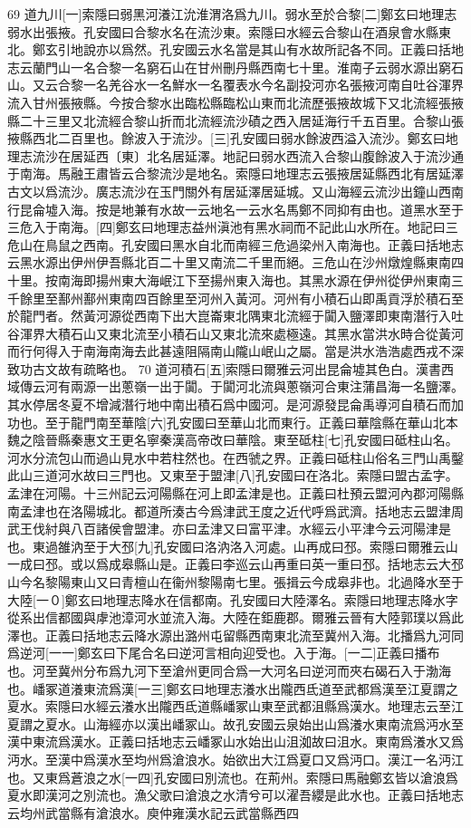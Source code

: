 69
道九川[一]索隱曰弱黑河瀁江沇淮渭洛爲九川。弱水至於合黎[二]鄭玄曰地理志弱水出張掖。孔安國曰合黎水名在流沙東。索隱曰水經云合黎山在酒泉會水縣東北。鄭玄引地說亦以爲然。孔安國云水名當是其山有水故所記各不同。正義曰括地志云蘭門山一名合黎一名窮石山在甘州刪丹縣西南七十里。淮南子云弱水源出窮石山。又云合黎一名羌谷水一名鮮水一名覆表水今名副投河亦名張掖河南自吐谷渾界流入甘州張掖縣。今按合黎水出臨松縣臨松山東而北流歷張掖故城下又北流經張掖縣二十三里又北流經合黎山折而北流經流沙磧之西入居延海行千五百里。合黎山張掖縣西北二百里也。餘波入于流沙。[三]孔安國曰弱水餘波西溢入流沙。鄭玄曰地理志流沙在居延西〔東〕北名居延澤。地記曰弱水西流入合黎山腹餘波入于流沙通于南海。馬融王肅皆云合黎流沙是地名。索隱曰地理志云張掖居延縣西北有居延澤古文以爲流沙。廣志流沙在玉門關外有居延澤居延城。又山海經云流沙出鐘山西南行昆侖墟入海。按是地兼有水故一云地名一云水名馬鄭不同抑有由也。道黑水至于三危入于南海。[四]鄭玄曰地理志益州滇池有黑水祠而不記此山水所在。地記曰三危山在鳥鼠之西南。孔安國曰黑水自北而南經三危過梁州入南海也。正義曰括地志云黑水源出伊州伊吾縣北百二十里又南流二千里而絕。三危山在沙州燉煌縣東南四十里。按南海即揚州東大海岷江下至揚州東入海也。其黑水源在伊州從伊州東南三千餘里至鄯州鄯州東南四百餘里至河州入黃河。河州有小積石山即禹貢浮於積石至於龍門者。然黃河源從西南下出大崑崙東北隅東北流經于闐入鹽澤即東南潛行入吐谷渾界大積石山又東北流至小積石山又東北流來處極遠。其黑水當洪水時合從黃河而行何得入于南海南海去此甚遠阻隔南山隴山岷山之屬。當是洪水浩浩處西戎不深致功古文故有疏略也。
70
道河積石[五]索隱曰爾雅云河出昆侖墟其色白。漢書西域傳云河有兩源一出蔥嶺一出于闐。于闐河北流與蔥嶺河合東注蒲昌海一名鹽澤。其水停居冬夏不增減潛行地中南出積石爲中國河。是河源發昆侖禹導河自積石而加功也。至于龍門南至華陰[六]孔安國曰至華山北而東行。正義曰華陰縣在華山北本魏之陰晉縣秦惠文王更名寧秦漢高帝改曰華陰。東至砥柱[七]孔安國曰砥柱山名。河水分流包山而過山見水中若柱然也。在西虢之界。正義曰砥柱山俗名三門山禹鑿此山三道河水故曰三門也。又東至于盟津[八]孔安國曰在洛北。索隱曰盟古孟字。孟津在河陽。十三州記云河陽縣在河上即孟津是也。正義曰杜預云盟河內郡河陽縣南孟津也在洛陽城北。都道所湊古今爲津武王度之近代呼爲武濟。括地志云盟津周武王伐紂與八百諸侯會盟津。亦曰孟津又曰富平津。水經云小平津今云河陽津是也。東過雒汭至于大邳[九]孔安國曰洛汭洛入河處。山再成曰邳。索隱曰爾雅云山一成曰邳。或以爲成皋縣山是。正義曰李巡云山再重曰英一重曰邳。括地志云大邳山今名黎陽東山又曰青檀山在衞州黎陽南七里。張揖云今成皋非也。北過降水至于大陸[一０]鄭玄曰地理志降水在信都南。孔安國曰大陸澤名。索隱曰地理志降水字從系出信都國與虖池漳河水並流入海。大陸在鉅鹿郡。爾雅云晉有大陸郭璞以爲此澤也。正義曰括地志云降水源出潞州屯留縣西南東北流至冀州入海。北播爲九河同爲逆河[一一]鄭玄曰下尾合名曰逆河言相向迎受也。入于海。[一二]正義曰播布也。河至冀州分布爲九河下至滄州更同合爲一大河名曰逆河而夾右碣石入于渤海也。嶓冢道瀁東流爲漢[一三]鄭玄曰地理志瀁水出隴西氐道至武都爲漢至江夏謂之夏水。索隱曰水經云瀁水出隴西氐道縣嶓冢山東至武都沮縣爲漢水。地理志云至江夏謂之夏水。山海經亦以漢出嶓冢山。故孔安國云泉始出山爲瀁水東南流爲沔水至漢中東流爲漢水。正義曰括地志云嶓冢山水始出山沮洳故曰沮水。東南爲瀁水又爲沔水。至漢中爲漢水至均州爲滄浪水。始欲出大江爲夏口又爲沔口。漢江一名沔江也。又東爲蒼浪之水[一四]孔安國曰別流也。在荊州。索隱曰馬融鄭玄皆以滄浪爲夏水即漢河之別流也。漁父歌曰滄浪之水清兮可以濯吾纓是此水也。正義曰括地志云均州武當縣有滄浪水。庾仲雍漢水記云武當縣西四
